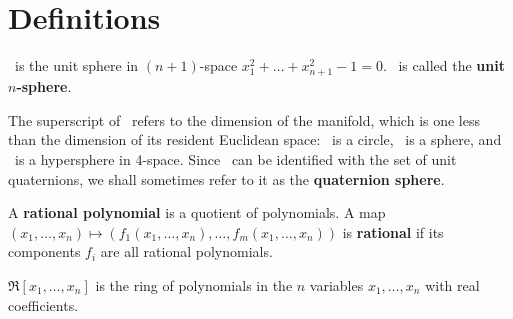 %
%



\section{Definitions}
\label{sec:defn}

\begin{defn2}
\ is the unit sphere in $(n+1)$-space $x_1^2 + \ldots + x_{n+1}^2 - 1 = 0$.
\ is called the {\bf unit $n$-sphere}.
\end{defn2}
%
The superscript of \Sn\ refers to the dimension of the manifold, which is one less
than the dimension of its resident Euclidean space:
\ is a circle, \ is a sphere, and \ is a hypersphere
in 4-space.
Since \ can be identified with the set of unit quaternions,
we shall sometimes refer to it as the {\bf quaternion sphere}.

\begin{defn2}
A {\bf rational polynomial} is a quotient of polynomials.
A map 
$(x_1,\ldots,x_n) \mapsto (f_1 (x_1,\ldots,x_n),\ldots,f_m (x_1,\ldots,x_n))$
is {\bf rational} if 
its components $f_i$ are all rational polynomials.
\end{defn2}

\begin{defn2}
$\Re[x_1,\ldots,x_n]$ is the ring of polynomials in the $n$ variables
$x_1,\ldots,x_n$ with real coefficients.
\end{defn2}

